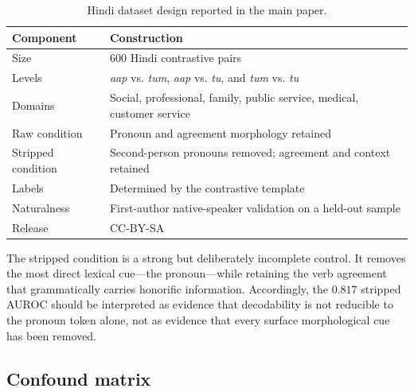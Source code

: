 \documentclass[10pt]{article}
\newcommand{\aap}{\textit{aap}}
\newcommand{\tum}{\textit{tum}}
\newcommand{\tu}{\textit{tu}}
\begin{document}
\begin{table}[H]
\centering
\small
\begin{tabularx}{\columnwidth}{p{2.2cm}X}
\toprule
\textbf{Component} & \textbf{Construction} \\
\midrule
Size & 600 Hindi contrastive pairs \\
Levels & \aap{} vs. \tum{}, \aap{} vs. \tu{}, and \tum{} vs. \tu{} \\
Domains & Social, professional, family, public service, medical, customer service \\
Raw condition & Pronoun and agreement morphology retained \\
Stripped condition & Second-person pronouns removed; agreement and context retained \\
Labels & Determined by the contrastive template \\
Naturalness & First-author native-speaker validation on a held-out sample \\
Release & CC-BY-SA \\
\bottomrule
\end{tabularx}
\caption{Hindi dataset design reported in the main paper.}
\label{tab:data-design}
\end{table}

The stripped condition is a strong but deliberately incomplete control. It
removes the most direct lexical cue---the pronoun---while retaining the verb
agreement that grammatically carries honorific information. Accordingly, the
$0.817$ stripped AUROC should be interpreted as evidence that decodability is
not reducible to the pronoun token alone, not as evidence that every surface
morphological cue has been removed.

\subsection{Confound matrix}
\end{document}
